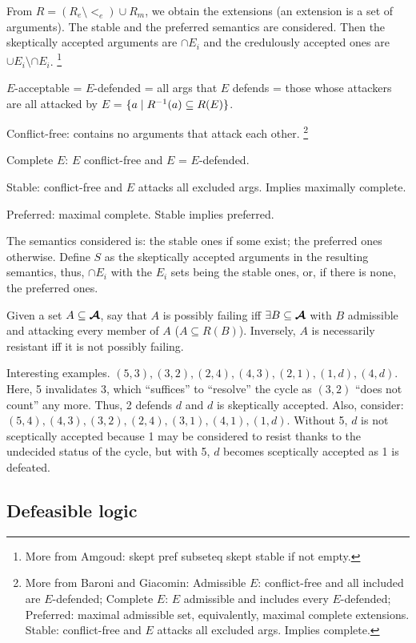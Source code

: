 \documentclass[version=3.21, pagesize, twoside=off, bibliography=totoc, DIV=calc, fontsize=12pt, a4paper, french, english]{scrartcl}
\begin{document}
From $R = (R_e \setminus {<_e}) \cup R_m$, we obtain the extensions (an extension is a set of arguments). The stable and the preferred semantics are considered. Then the skeptically accepted arguments are $\cap E_i$ and the credulously accepted ones are $\cup E_i \setminus \cap E_i$.
\footnote{More from Amgoud: skept pref subseteq skept stable if not empty.}

$E$-acceptable = $E$-defended = all args that $E$ defends = those whose attackers are all attacked by $E$ = $\set{a \suchthat R^{-1}(a)\subseteq R(E)}$.

Conflict-free: contains no arguments that attack each other.
\footnote{More from Baroni and Giacomin: Admissible $E$: conflict-free and all included are $E$-defended; Complete $E$: $E$ admissible and includes every $E$-defended; Preferred: maximal admissible set, equivalently, maximal complete extensions. Stable: conflict-free and $E$ attacks all excluded args. Implies complete.}

Complete $E$: $E$ conflict-free and $E$ = $E$-defended.

Stable: conflict-free and $E$ attacks all excluded args. Implies maximally complete.

Preferred: maximal complete. Stable implies preferred. 

The semantics considered is: the stable ones if some exist; the preferred ones otherwise. Define $S$ as the skeptically accepted arguments in the resulting semantics, thus, $\cap E_i$ with the $E_i$ sets being the stable ones, or, if there is none, the preferred ones.

Given a set $A \subseteq \bm{\mathcal{A}}$, say that $A$ is possibly failing iff $\exists B \subseteq \bm{\mathcal{A}}$ with $B$ admissible and attacking every member of $A$ ($A \subseteq R(B)$).
Inversely, $A$ is necessarily resistant iff it is not possibly failing.

Interesting examples. $(5, 3), (3, 2), (2, 4), (4, 3), (2, 1), (1, d), (4, d)$. Here, 5 invalidates 3, which “suffices” to “resolve” the cycle as $(3, 2)$ “does not count” any more. Thus, 2 defends $d$ and $d$ is skeptically accepted. Also, consider: $(5, 4), (4, 3), (3, 2), (2, 4), (3, 1), (4, 1), (1, d)$. Without 5, $d$ is not sceptically accepted because 1 may be considered to resist thanks to the undecided status of the cycle, but with 5, $d$ becomes sceptically accepted as 1 is defeated.

\subsection{Defeasible logic}
\end{document}
